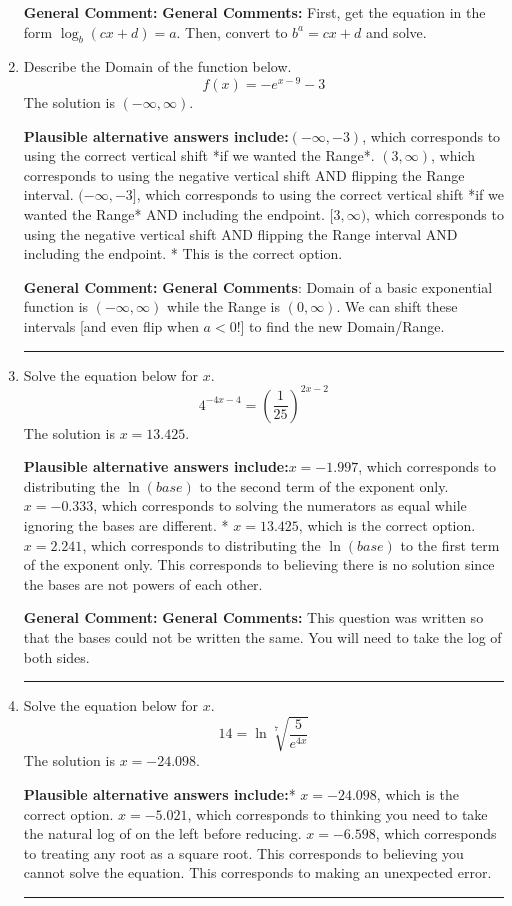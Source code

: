 \documentclass{extbook}[14pt]
\newcommand{\litem}[1]{\item #1

\rule{\textwidth}{0.4pt}}
\begin{document}
\begin{enumerate}
{\textbf{General Comment:} \textbf{General Comments:} First, get the equation in the form $\log_b{(cx+d)} = a$. Then, convert to $b^a = cx+d$ and solve.
}
\litem{
Describe the Domain of the function below.
\[ f(x) = -e^{x-9}-3 \]The solution is \( (-\infty, \infty) \).\begin{enumerate}[label=\Alph*.]
\textbf{Plausible alternative answers include:}$(-\infty, -3)$, which corresponds to using the correct vertical shift *if we wanted the Range*.
$(3, \infty)$, which corresponds to using the negative vertical shift AND flipping the Range interval.
$(-\infty, -3]$, which corresponds to using the correct vertical shift *if we wanted the Range* AND including the endpoint.
$[3, \infty)$, which corresponds to using the negative vertical shift AND flipping the Range interval AND including the endpoint.
* This is the correct option.
\end{enumerate}

\textbf{General Comment:} \textbf{General Comments}: Domain of a basic exponential function is $(-\infty, \infty)$ while the Range is $(0, \infty)$. We can shift these intervals [and even flip when $a<0$!] to find the new Domain/Range.
}
\litem{
Solve the equation below for $x$.
\[ 4^{-4x-4} = \left(\frac{1}{25}\right)^{2x-2} \]The solution is \( x = 13.425 \).\begin{enumerate}[label=\Alph*.]
\textbf{Plausible alternative answers include:}$x = -1.997$, which corresponds to distributing the $\ln(base)$ to the second term of the exponent only.
$x = -0.333$, which corresponds to solving the numerators as equal while ignoring the bases are different.
* $x = 13.425$, which is the correct option.
$x = 2.241$, which corresponds to distributing the $\ln(base)$ to the first term of the exponent only.
This corresponds to believing there is no solution since the bases are not powers of each other.
\end{enumerate}

\textbf{General Comment:} \textbf{General Comments:} This question was written so that the bases could not be written the same. You will need to take the log of both sides.
}
\litem{
Solve the equation below for $x$.
\[  14 = \ln{\sqrt[7]{\frac{5}{e^{4x}}}} \]The solution is \( x = -24.098 \).\begin{enumerate}[label=\Alph*.]
\textbf{Plausible alternative answers include:}* $x = -24.098$, which is the correct option.
$x = -5.021$, which corresponds to thinking you need to take the natural log of on the left before reducing.
$x = -6.598$, which corresponds to treating any root as a square root.
This corresponds to believing you cannot solve the equation.
This corresponds to making an unexpected error.
\end{enumerate}

}
\end{enumerate}
\end{document}
